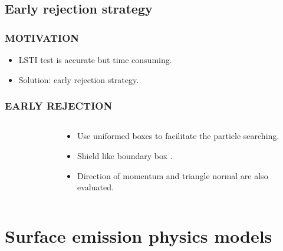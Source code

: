 \documentclass{beamer}
\begin{document}
\subsection{Early rejection strategy}
\begin{frame}
\frametitle{MOTIVATION}
\begin{itemize}

\item LSTI test is accurate but time consuming. 
\pause
\item Solution: early rejection strategy.
\end{itemize}
\end{frame}
\begin{frame}
\frametitle{EARLY REJECTION}
\begin{columns}
\begin{column}[t]{5.5cm}
\begin{figure}[H]
\begin{center}


\end{center}
\end{figure}
\pause
\end{column}
\begin{column}[t]{5cm}
\begin{itemize}

\item Use uniformed boxes to facilitate the particle searching.
\pause
\item Shield like boundary box .
\pause
\item Direction of momentum and triangle normal are also evaluated.

\end{itemize}
\end{column}
\end{columns}
\end{frame}

\section{Surface emission physics models}
\end{document}
